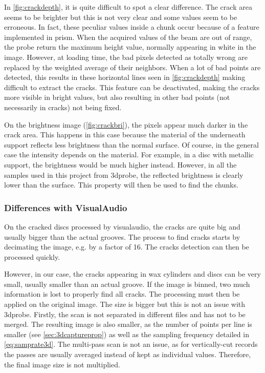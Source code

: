 In \autoref{fig:crackdepth}, it is quite difficult to spot a clear difference. The crack area seems to be brighter but this is not very clear and some values seem to be erroneous. In fact, these peculiar values inside a chunk occur because of a feature implemented in \gls{prism}. When the acquired values of the beam are out of range, the probe return the maximum height value, normally appearing in white in the image. However, at loading time, the bad pixels detected as totally wrong are replaced by the weighted average of their neighbors. When a lot of bad points are detected, this results in these horizontal lines seen in \autoref{fig:crackdepth} making difficult to extract the cracks. This feature can be deactivated, making the cracks more visible in bright values, but also resulting in other bad points (not necessarily in cracks) not being fixed.

On the brightness image (\autoref{fig:crackbri}), the pixels appear much darker in the crack area. This happens in this case because the material of the underneath support reflects less brightness than the normal surface. Of course, in the general case the intensity depends on the material. For example, in a disc with metallic support, the brightness would be much higher instead. However, in all the samples used in this project from \gls{3dprobe}, the reflected brightness is clearly lower than the surface. This property will then be used to find the chunks.

\subsubsection{Differences with VisualAudio}

On the cracked discs processed by \gls{visualaudio}, the cracks are quite big and usually bigger than the actual grooves. The process to find cracks starts by decimating the image, e.g. by a factor of 16. The cracks detection can then be processed quickly.

However, in our case, the cracks appearing in wax cylinders and discs can be very small, usually smaller than an actual groove. If the image is binned, two much information is lost to properly find all cracks. The processing must then be applied on the original image. The size is bigger but this is not an issue with \gls{3dprobe}. Firstly, the scan is not separated in different files and has not to be merged. The resulting image is also smaller, as the number of points per line is smaller (see \autoref{sec:3dcaptureprop}) as well as the sampling frequency detailed in \eqref{eq:samprate3d}. The multi-pass scan is not an issue, as for vertically-cut records the passes are usually averaged instead of kept as individual values. Therefore, the final image size is not multiplied.

